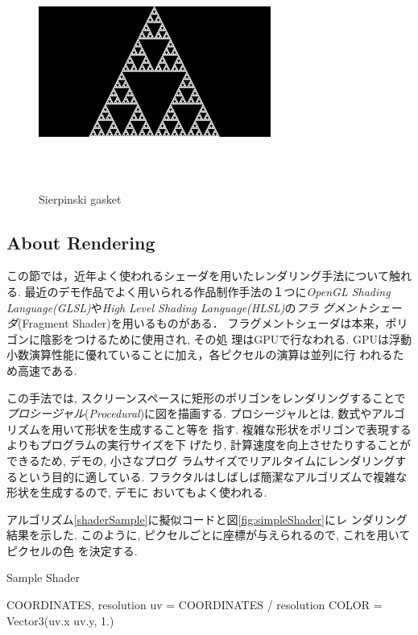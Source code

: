 \begin{figure}[htbp]
 \center
 \includegraphics[width=3in, height=3in, keepaspectratio]{../img/fractal/gasket.pdf}
 \caption{Sierpinski gasket}
 \label{fig:gasket}
\end{figure}

\subsection{About Rendering}

この節では，近年よく使われるシェーダを用いたレンダリング手法について触れる.
最近のデモ作品でよく用いられる作品制作手法の１つに\textit{OpenGL Shading
Language(GLSL)}や\textit{High Level Shading Language(HLSL)}の\emph{フラ
グメントシェーダ}(Fragment Shader)を用いるものがある．
フラグメントシェーダは本来，ポリゴンに陰影をつけるために使用され, その処
理はGPUで行なわれる.
GPUは浮動小数演算性能に優れていることに加え，各ピクセルの演算は並列に行
われるため高速である.

この手法では, スクリーンスペースに矩形のポリゴンをレンダリングすることで
\emph{プロシージャル}(\textit{Procedural})に図を描画する.
プロシージャルとは, 数式やアルゴリズムを用いて形状を生成すること等を
指す.
複雑な形状をポリゴンで表現するよりもプログラムの実行サイズを下
げたり, 計算速度を向上させたりすることができるため, デモの, 小さなプログ
ラムサイズでリアルタイムにレンダリングするという目的に適している.
フラクタルはしばしば簡潔なアルゴリズムで複雑な形状を生成するので, デモに
おいてもよく使われる.

アルゴリズム\ref{shaderSample}に擬似コードと図\ref{fig:simpleShader}にレ
ンダリング結果を示した.
このように, ピクセルごとに座標が与えられるので, これを用いてピクセルの色
を決定する.

\begin{algorithm}
 \begin{algorithmic}
\begin{minipage}{0.5\hsize}

 \caption{Sample Shader}
 \label{shaderSample}
  \REQUIRE COORDINATES, resolution
  \STATE uv = COORDINATES / resolution
  \STATE COLOR = Vector3(uv.x uv.y, 1.)
\end{minipage}
 \end{algorithmic}
\end{algorithm}


